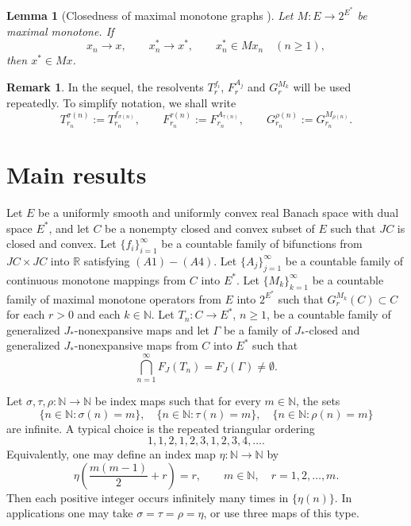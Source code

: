 \documentclass[leqno,12pt]{amsart}
\newtheorem{lemma}[theorem]{Lemma}
\theoremstyle{definition}
\newtheorem{remark}[theorem]{Remark}
\numberwithin{equation}{section}
\begin{document}
\begin{lemma}[Closedness of maximal monotone graphs \cite{Rockafellar1970,AlberRyazantseva2006}]\label{closedgraphM}
Let $M:E\to 2^{E^{*}}$ be maximal monotone. If
\[
x_n\to x,\qquad x_n^{*}\to x^{*},\qquad x_n^{*}\in Mx_n\quad(n\geq1),
\]
then $x^{*}\in Mx$.
\end{lemma}

\begin{remark}
In the sequel, the resolvents $T_r^{f_i}$, $F_r^{A_j}$ and $G_r^{M_k}$ will be used repeatedly. To simplify notation, we shall write
\[
T_{r_n}^{\sigma(n)}:=T_{r_n}^{f_{\sigma(n)}},\qquad
F_{r_n}^{\tau(n)}:=F_{r_n}^{A_{\tau(n)}},\qquad
G_{r_n}^{\rho(n)}:=G_{r_n}^{M_{\rho(n)}}.
\]
\end{remark}

\section{Main results}

Let $E$ be a uniformly smooth and uniformly convex real Banach space with dual space $E^{*}$, and let $C$ be a nonempty closed and convex subset of $E$ such that $JC$ is closed and convex. Let $\{f_i\}_{i=1}^{\infty}$ be a countable family of bifunctions from $JC\times JC$ into $\mathbb{R}$ satisfying $(A1)-(A4)$. Let $\{A_j\}_{j=1}^{\infty}$ be a countable family of continuous monotone mappings from $C$ into $E^{*}$. Let $\{M_k\}_{k=1}^{\infty}$ be a countable family of maximal monotone operators from $E$ into $2^{E^{*}}$ such that $G_r^{M_k}(C)\subset C$ for each $r>0$ and each $k\in\mathbb{N}$. Let $T_n:C\to E^{*}$, $n\geq1$, be a countable family of generalized $J_{*}$-nonexpansive maps and let $\Gamma$ be a family of $J_{*}$-closed and generalized $J_{*}$-nonexpansive maps from $C$ into $E^{*}$ such that
\[
\bigcap_{n=1}^{\infty}F_J(T_n)=F_J(\Gamma)\neq\emptyset.
\]

Let $\sigma,\tau,\rho:\mathbb{N}\to\mathbb{N}$ be index maps such that for every $m\in\mathbb{N}$, the sets
\[
\{n\in\mathbb{N}:\sigma(n)=m\},\quad
\{n\in\mathbb{N}:\tau(n)=m\},\quad
\{n\in\mathbb{N}:\rho(n)=m\}
\]
are infinite. A typical choice is the repeated triangular ordering
\[
1,1,2,1,2,3,1,2,3,4,\ldots.
\]
Equivalently, one may define an index map $\eta:\mathbb N\to\mathbb N$ by
\[
\eta\left(\frac{m(m-1)}{2}+r\right)=r,
\qquad m\in\mathbb N,\quad r=1,2,\ldots,m.
\]
Then each positive integer occurs infinitely many times in $\{\eta(n)\}$. In applications one may take $\sigma=\tau=\rho=\eta$, or use three maps of this type.
\end{document}
